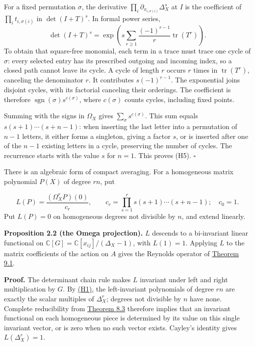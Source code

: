 \documentclass[
]{article}
\newcounter{none} %
\begin{document}
For a fixed permutation \(\sigma\), the derivative
\(\prod_i\partial_{x_{i,\sigma(i)}}\Delta_X^s\) at \(I\) is the
coefficient of \(\prod_i t_{i,\sigma(i)}\) in \(\det(I+T)^s\). In formal
power series, \[
\det(I+T)^s
=\exp\left(s\sum_{r\geq1}\frac{(-1)^{r-1}}r
\operatorname{tr}(T^r)\right).
\] To obtain that square-free monomial, each term in a trace must trace
one cycle of \(\sigma\): every selected entry has its prescribed
outgoing and incoming index, so a closed path cannot leave its cycle. A
cycle of length \(r\) occurs \(r\) times in \(\operatorname{tr}(T^r)\),
canceling the denominator \(r\). It contributes \(s(-1)^{r-1}\). The
exponential joins disjoint cycles, with its factorial canceling their
orderings. The coefficient is therefore
\(\operatorname{sgn}(\sigma)s^{c(\sigma)}\), where \(c(\sigma)\) counts
cycles, including fixed points.

Summing with the signs in \(\Omega_X\) gives
\(\sum_\sigma s^{c(\sigma)}\). This sum equals \(s(s+1)\cdots(s+n-1)\):
when inserting the last letter into a permutation of \(n-1\) letters, it
either forms a singleton, giving a factor \(s\), or is inserted after
one of the \(n-1\) existing letters in a cycle, preserving the number of
cycles. The recurrence starts with the value \(s\) for \(n=1\). This
proves (H5). \(\square\)

There is an algebraic form of compact averaging. For a homogeneous
matrix polynomial \(P(X)\) of degree \(rn\), put
\protect{}\label{equation-H6}{}

\[
L(P)=\frac{(\Omega_X^rP)(0)}{c_r},\qquad
c_r=\prod_{s=1}^r s(s+1)\cdots(s+n-1);
\quad c_0=1.
\tag{H6}
\] Put \(L(P)=0\) on homogeneous degrees not divisible by \(n\), and
extend linearly.

\protect{}\label{proposition-2-2}{}

\textbf{Proposition 2.2 (the Omega projection).} \(L\) descends to a
bi-invariant linear functional on
\(\mathbb C [G]=\mathbb C [x_{ij}]/(\Delta_X-1)\), with \(L(1)=1\).
Applying \(L\) to the matrix coefficients of the action on \(A\) gives
the Reynolds operator of \href{NOE-INV-01.html\#theorem-9-1}{Theorem
9.1}.

\textbf{Proof.} The determinant chain rule makes \(L\) invariant under
left and right multiplication by \(G\). By
\href{NOE-INV-01.html\#equation-H1}{(H1)}, the left-invariant
polynomials of degree \(rn\) are exactly the scalar multiples of
\(\Delta_X^r\); degrees not divisible by \(n\) have none. Complete
reducibility from \href{NOE-INV-01.html\#theorem-8-3}{Theorem 8.3}
therefore implies that an invariant functional on each homogeneous piece
is determined by its value on this single invariant vector, or is zero
when no such vector exists. Cayley's identity gives \(L(\Delta_X^r)=1\).
\end{document}
